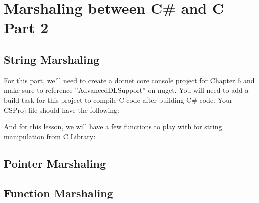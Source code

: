 \chapter{Marshaling between C\# and C Part 2}
\section{String Marshaling}
For this part, we'll need to create a dotnet core console project for Chapter 6 and make sure to reference ''AdvancedDLSupport'' on nuget. You will need to add a build task for this project to compile C code after building C\# code. Your CSProj file should have the following:


And for this lesson, we will have a few functions to play with for string manipulation from C Library:



\section{Pointer Marshaling}

\section{Function Marshaling}